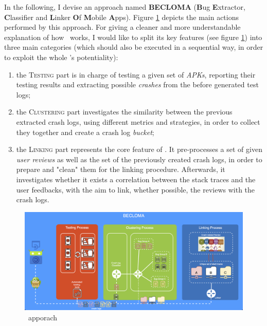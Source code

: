 \label{chapter:approach}
In the following, I devise an approach named \textbf{BECLOMA} (\textbf{B}ug \textbf{E}xtractor, \textbf{C}lassifier and \textbf{L}inker \textbf{O}f \textbf{M}obile \textbf{A}pps).
Figure \ref{fig: becloma} depicts the main actions performed by this approach.
For giving a cleaner and more understandable explanation of how \toolname\ works, I would like to split its key features (see figure \ref{fig: becloma}) into three main categories (which should also be executed in a sequential way, in order to exploit the whole \toolname's potentiality): 
\begin{enumerate}
\item the \textsc{Testing} part is in charge of testing a given set of \textit{APKs}, reporting their testing results and extracting possible \textit{crashes} from the before generated test logs; 

\item the \textsc{Clustering} part investigates the similarity between the previous extracted crash logs, using different metrics and strategies, in order to collect they together and create a crash log \textit{bucket}; 

\item the \textsc{Linking} part represents the core feature of \toolname. It pre-processes a set of given \textit{user reviews} as well as the set of the previously created crash logs, in order to prepare and "clean" them for the linking procedure.  Afterwards, it investigates whether it exists a correlation between the stack traces and the user feedbacks, with the aim to link, whether possible, the reviews with the crash logs. 
\end{enumerate}
\begin{figure}[tb]
\centering 
\includegraphics[width=\columnwidth]{diagrams/becloma_approach_img} 
\caption{\toolname\ apporach}
\label{fig: becloma}
\end{figure}


